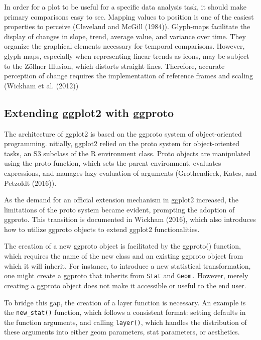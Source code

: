 In order for a plot to be useful for a specific data analysis task, it should make primary comparisons easy to see. Mapping values to position is one of the easiest properties to perceive (Cleveland and McGill (1984)). Glyph-maps facilitate the display of changes in slope, trend, average value, and variance over time. They organize the graphical elements necessary for temporal comparisons. However, glyph-maps, especially when representing linear trends as icons, may be subject to the Zöllner Illusion, which distorts straight lines. Therefore, accurate perception of change requires the implementation of reference frames and scaling (Wickham et al. (2012))

\hypertarget{extending-ggplot2-with-ggproto}{%
\subsection{Extending ggplot2 with ggproto}\label{extending-ggplot2-with-ggproto}}

The architecture of ggplot2 is based on the ggproto system of object-oriented programming. nitially, ggplot2 relied on the proto system for object-oriented tasks, an S3 subclass of the R environment class. Proto objects are manipulated using the proto function, which sets the parent environment, evaluates expressions, and manages lazy evaluation of arguments (Grothendieck, Kates, and Petzoldt (2016)).

As the demand for an official extension mechanism in ggplot2 increased, the limitations of the proto system became evident, prompting the adoption of ggproto. This transition is documented in Wickham (2016), which also introduces how to utilize ggproto objects to extend ggplot2 functionalities.

The creation of a new ggproto object is facilitated by the ggproto() function, which requires the name of the new class and an existing ggproto object from which it will inherit. For instance, to introduce a new statistical transformation, one might create a ggproto that inherits from \texttt{Stat} and \texttt{Geom.} However, merely creating a ggproto object does not make it accessible or useful to the end user.

To bridge this gap, the creation of a layer function is necessary. An example is the \texttt{new\_stat()} function, which follows a consistent format: setting defaults in the function arguments, and calling \texttt{layer()}, which handles the distribution of these arguments into either geom parameters, stat parameters, or aesthetics.

